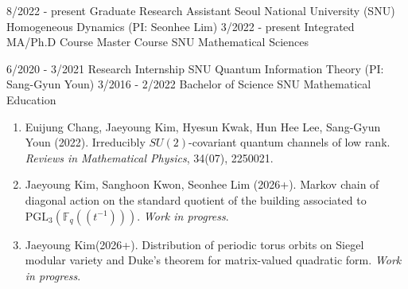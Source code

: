 \documentclass[9pt]{developercv} %
\begin{document}
\begin{entrylist}
	\entry
		{8/2022 - present}
		{Graduate Research Assistant}
		{Seoul National University (SNU)}
		{Homogeneous Dynamics (PI: Seonhee Lim)}
	\entry
		{3/2022 - present}
		{Integrated MA/Ph.D Course Master Course}
		{SNU}
		{Mathematical Sciences}

	\entry
		{6/2020 - 3/2021}
		{Research Internship}
		{SNU}
		{Quantum Information Theory (PI: Sang-Gyun Youn)}
	\entry
		{3/2016 - 2/2022}
		{Bachelor of Science}
		{SNU}
		{Mathematical Education \\ \small{ \color{gray}{Leave for Mandatory Military Service (1/2018 - 9/2019)}}}
\end{entrylist}

\vspace{-10 pt}
\begin{enumerate}
    \item Euijung Chang, Jaeyoung Kim, Hyesun Kwak, Hun Hee Lee, Sang-Gyun Youn (2022). Irreducibly $SU (2)$-covariant quantum channels of low rank. \textit{Reviews in Mathematical Physics}, 34(07), 2250021.
    \item Jaeyoung Kim, Sanghoon Kwon, Seonhee Lim (2026+). Markov chain of diagonal action on the standard quotient of the building associated to $\mathrm{PGL}_3\left(\mathbb{F}_q(\!(t^{-1})\!)\right)$. \textit{Work in progress}.
    \item Jaeyoung Kim(2026+). Distribution of periodic torus orbits on Siegel modular variety and Duke's theorem for matrix-valued quadratic form. \textit{Work in progress}.
\end{enumerate}
\end{document}
